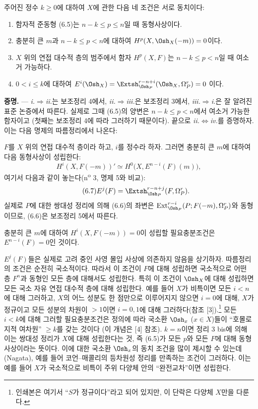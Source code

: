  주어진 정수 $k\geq0$에 대하여 $X$에 관한
다음 네 조건은 서로 동치이다:
\begin{enumerate}
  \item[\textit{i.}] 함자적 준동형 (6.5)는 $n-k\leq p\leq n$일 때
    동형사상이다.
  \item[\textit{ii.}] 충분히 큰 $m$과 $n-k\leq p<n$에 대하여
    $H^{p}(X,\Osh_X(-m))=0$이다.
  \item[\textit{iii.}] $X$ 위의 연접 대수적 층의 범주에서 함자
    $H^{p}(X,F)$는 $n-k\leq p<n$일 때 여소거 가능하다.
  \item[\textit{iv.}] $0<i\leq k$에 대하여
    $E^{i}(\Osh_X)=\Extsh_{\Osh_P}^{r-n+i}(\Osh_X,\Omega_P^{r})=0$
    이다.
\end{enumerate}

\noindent\textbf{증명.} --- \textit{i.}$\Rightarrow$\textit{ii.}는
보조정리 4에서, \textit{ii.}$\Rightarrow$\textit{iii.}은 보조정리 3에서,
\textit{iii.}$\Rightarrow$\textit{i.}은 잘 알려진 표준 논증에서 따른다.
실제로 그때 (6.5)의 양변은 $n-k\leq p<n$에서 여소거 가능한 함자이고
(첫째는 보조정리 4에 따라 그러하기 때문이다). 끝으로
\textit{ii.}$\Leftrightarrow$\textit{iv.}를 증명하자. 이는 다음 명제의
따름정리에서 나온다:

 $F$를 $X$ 위의 연접 대수적 층이라 하고,
$i$를 정수라 하자. 그러면 충분히 큰 $m$에 대하여 다음 동형사상이 성립한다:
\begin{equation}\tag{6.6}
  H^{i}(X,F(-m))'
  \simeq H^{0}\bigl(X,E^{n-i}(F)(m)\bigr),
\end{equation}
여기서 다음과 같이 놓는다(n\textsuperscript{o} 3, 명제 5와 비교):
\begin{equation}\tag{6.7}
  E^{j}(F)=\Extsh_{\Osh_P}^{r-n+j}(F,\Omega_P^{r}).
\end{equation}
실제로 $P$에 대한 쌍대성 정리에 의해 (6.6)의 좌변은
$\operatorname{Ext}_{\Osh_P}^{r-i}(P;F(-m),\Omega_P^{r})$와 동형이므로,
(6.6)은 보조정리 5에서
따른다.

 충분히 큰 $m$에 대하여 $H^{i}(X,F(-m))=0$이
성립할 필요충분조건은 $E^{n-i}(F)=0$인 것이다.

$E^{j}(F)$들은 실제로 고려 중인 사영 몰입 사상에 의존하지 않음을 상기하자.
따름정리의 조건은 순전히 국소적이다. 따라서
이 조건이 $F$에 대해 성립하면 국소적으로
어떤 층 $F^{n}$과 동형인 모든 층에 대해서도 성립한다. 특히 이 조건이
$\Osh_X$에 대해 성립하면 모든 국소 자유 연접 대수적 층에 대해
성립한다. 예를 들어 $X$가 비특이면 모든 $i<n$에 대해 그러하고,
$X$의 어느 성분도 한 점만으로 이루어지지 않으면 $i=0$에 대해,
$X$가 정규이고 모든 성분의 차원이 $>1$이면 $i=0,1$에 대해 그러하다(참조
[3]).\footnote{인쇄본은 여기서 ``$S$가 정규이다''라고 되어 있지만, 이 단락은
다양체 $X$만을 다룬다.} 모든 $i<k$에 대해 그러할 필요충분조건은
정의에 따라 국소환
$\Osh_x$ ($x\in X$)들이 ``호몰로지적 여차원'' $\geq k$를 갖는 것이다
(이 개념은 [4] 참조). $k=n$이면 정리 3 bis에 의해 이는
쌍대성 정리가 $X$에 대해 성립한다는 것, 즉 (6.5)가
모든 $p$와 모든 $F$에 대해 동형사상이라는 뜻이다. 이에 대한 국소환
$\Osh_x$의 동치 조건을 많이 제시할 수 있는데(Nagata), 예를 들어
코언--매콜리의 등차원성 정리를 만족하는 조건이 그러하다. 이는
예를 들어 $X$가 국소적으로 비특이 주위 다양체 안의 ``완전교차''이면
성립한다.

